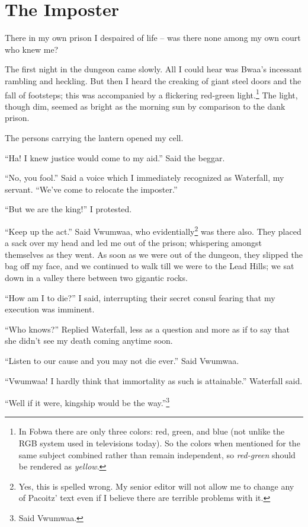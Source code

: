 \chapter{The Imposter}

There in my own prison I despaired of life -- was there none among my own court who knew me?

The first night in the dungeon came slowly. All I could hear was Bwaa's incessant rambling and heckling. But then I heard the creaking of giant steel doors and the fall of footsteps; this was accompanied by a flickering red-green light.\footnote{In Fobwa there are only three colors: red, green, and blue (not unlike the RGB system used in televisions today). So the colors when mentioned for the same subject combined rather than remain independent, so \emph{red-green} should be rendered as \emph{yellow}.}
The light, though dim, seemed as bright as the morning sun by comparison to the dank prison.

The persons carrying the lantern opened my cell.

``Ha! I knew justice would come to my aid.'' Said the beggar.

``No, you fool.'' Said a voice which I immediately recognized as Waterfall, my servant. ``We've come to relocate the imposter.''

``But we are the king!'' I protested.

``Keep up the act.'' Said Vwumwaa, who evidentially\footnote{Yes, this is spelled wrong. My senior editor will not allow me to change any of Pacoitz' text even if I believe there are terrible problems with it.} was there also. They placed a sack over my head and led me out of the prison; whispering amongst themselves as they went. As soon as we were out of the dungeon, they slipped the bag off my face, and we continued to walk till we were to the Lead Hills; we sat down in a valley there between two gigantic rocks.

``How am I to die?'' I said, interrupting their secret consul fearing that my execution was imminent.

``Who knows?'' Replied Waterfall, less as a question and more as if to say that she didn't see my death coming anytime soon.

``Listen to our cause and you may not die ever.'' Said Vwumwaa.

``Vwumwaa! I hardly think that immortality as such is attainable.'' Waterfall said.

``Well if it were, kingship would be the way.''\footnote{Said Vwumwaa.}

